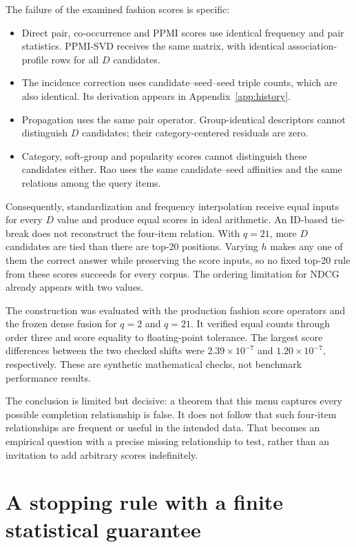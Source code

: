 \documentclass[11pt,a4paper]{article}
\begin{document}
The failure of the examined fashion scores is specific:
\begin{itemize}
\item Direct pair, co-occurrence and PPMI scores use identical frequency
and pair statistics. PPMI-SVD receives the same matrix, with identical
association-profile rows for all $D$ candidates.
\item The incidence correction uses candidate--seed--seed triple counts,
which are also identical. Its derivation appears in
Appendix~\ref{app:history}.
\item Propagation uses the same pair operator. Group-identical descriptors
cannot distinguish $D$ candidates; their category-centered residuals are zero.
\item Category, soft-group and popularity scores cannot distinguish these
candidates either. Rao uses the same candidate--seed affinities and the
same relations among the query items.
\end{itemize}

Consequently, standardization and frequency interpolation receive equal
inputs for every $D$ value and produce equal scores in ideal arithmetic.
An ID-based tie-break does not reconstruct the four-item relation. With
$q=21$, more $D$ candidates are tied than there are top-20 positions.
Varying $h$ makes any one of them the correct answer while preserving the
score inputs, so no fixed top-20 rule from these scores succeeds for every
corpus. The ordering limitation for NDCG already appears with two values.

The construction was evaluated with the production fashion score operators
and the frozen dense fusion for $q=2$ and $q=21$. It verified equal counts
through order three and score equality to floating-point tolerance. The
largest score differences between the two checked shifts were
$2.39\times10^{-7}$ and $1.20\times10^{-7}$, respectively.
These are synthetic mathematical checks, not benchmark performance results.

The conclusion is limited but decisive: a theorem that this menu captures
every possible completion relationship is false. It does not follow that
such four-item relationships are frequent or useful in the intended data.
That becomes an empirical question with a precise missing relationship to
test, rather than an invitation to add arbitrary scores indefinitely.

\section{A stopping rule with a finite statistical guarantee}
\label{sec:stopping}
\end{document}
